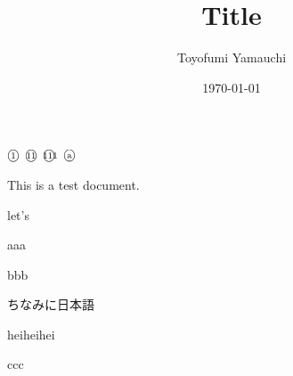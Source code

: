 \documentclass[letterpaper,oneside,12pt]{ltjsarticle}
\title{Title}
\author{Toyofumi Yamauchi}
\date{\monthdayyeardate\today}
\newcommand{\ctext}[1]{\raise0.2ex\hbox{\textcircled{\scriptsize{#1}}}}
\begin{document}
\maketitle

$\ctext{1}$
$\ctext{11}$
$\ctext{111}$
$\ctext{a}$

This is a test document.

let's

aaa

bbb

ちなみに日本語

heiheihei

ccc
\end{document}
